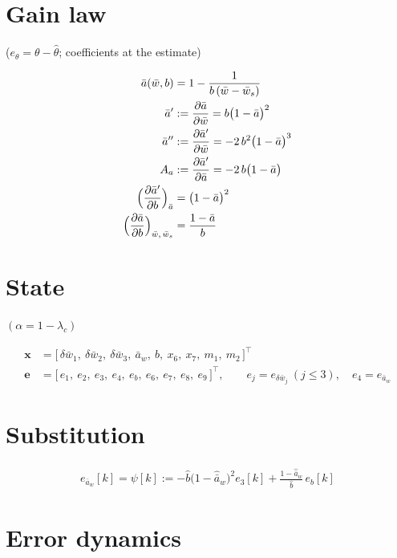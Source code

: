 \documentclass[11pt,a4paper,fontset=none]{ctexart}
\newcommand{\ba}{\bar{a}}
\newcommand{\bw}{\bar{w}}
\newcommand{\ap}{\ba'}
\newcommand{\app}{\ba''}
\newcommand{\ah}{\hat{\ba}_w}
\newcommand{\bh}{\hat{b}}
\newcommand{\ea}{e_{\ba_w}}
\begin{document}
\section{Gain law}

($e_\theta = \theta - \hat\theta$; coefficients at the estimate)

\begin{align*}
\ba(\bw, b) &= 1 - \frac{1}{b\,(\bw - \bw_s)} \\
\ap &:= \frac{\partial\ba}{\partial\bw} = b\bigl(1-\ba\bigr)^{2} \\
\app &:= \frac{\partial\ap}{\partial\bw} = -2\,b^{2}\bigl(1-\ba\bigr)^{3} \\
A_a &:= \frac{\partial\ap}{\partial\ba} = -2\,b\bigl(1-\ba\bigr) \\
\Bigl(\frac{\partial\ap}{\partial b}\Bigr)_{\ba} &= \bigl(1-\ba\bigr)^{2} \\
\Bigl(\frac{\partial\ba}{\partial b}\Bigr)_{\bw,\,\bw_s} &= \frac{1-\ba}{b}
\end{align*}

\section{State}

$(\alpha = 1-\lambda_c)$

\begin{align*}
\mathbf{x} &= \bigl[\,\delta\bw_1,\ \delta\bw_2,\ \delta\bw_3,\ \ba_w,\ b,\ x_6,\ x_7,\ m_1,\ m_2\,\bigr]^{\top} \\
\mathbf{e} &= \bigl[\,e_1,\ e_2,\ e_3,\ e_4,\ e_b,\ e_6,\ e_7,\ e_8,\ e_9\,\bigr]^{\top}, \qquad
e_j = e_{\delta\bw_j}\ (j \le 3), \quad e_4 = \ea
\end{align*}

\section{Substitution}

\begin{align*}
\ea[k] = \psi[k] := -\bh\bigl(1-\ah\bigr)^{2}e_3[k] + \frac{1-\ah}{\bh}\,e_b[k]
\end{align*}

\section{Error dynamics}
\end{document}
